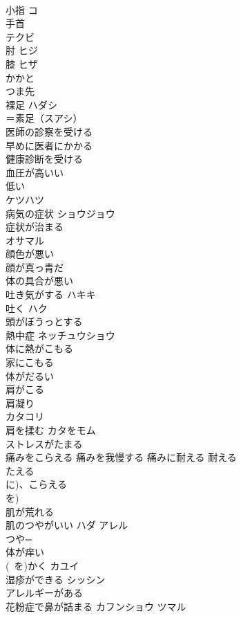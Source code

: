 \documentclass[8pt]{extreport}
\begin{document}
\begin{CJK}{UTF8}{min}
\\	小指	コ 
\\	手首	
\\	テクビ
\\	肘	ヒジ 
\\	膝	ヒザ 
\\	かかと	
\\	つま先	
\\	裸足	ハダシ 
\\	＝素足（スアシ）
\\	医師の診察を受ける	
\\	早めに医者にかかる	
\\	健康診断を受ける	
\\	血圧が高いい　
\\	低い	
\\	ケツハツ
\\	病気の症状	ショウジョウ 
\\	症状が治まる	
\\	オサマル
\\	顔色が悪い	
\\	顔が真っ青だ	
\\	体の具合が悪い	
\\	吐き気がする	ハキキ 
\\	吐く	ハク 
\\	頭がぼうっとする	
\\	熱中症	ネッチュウショウ 
\\	体に熱がこもる 
\\	家にこもる	
\\	体がだるい	
\\	肩がこる 
\\	肩凝り	
\\	カタコリ
\\	肩を揉む	カタをモム 
\\	ストレスがたまる	
\\	痛みをこらえる 痛みを我慢する 痛みに耐える	耐える　
\\	たえる
\\	に)、こらえる
\\	を) 
\\	肌が荒れる 
\\	肌のつやがいい	ハダ アレル 
\\	つや=
\\	体が痒い 
\\	(~を)かく	カユイ 
\\	湿疹ができる	シッシン 
\\	アレルギーがある	
\\	花粉症で鼻が詰まる	カフンショウ ツマル 

\end{CJK}
\end{document}
